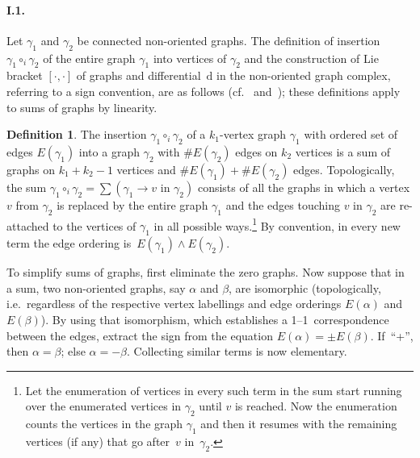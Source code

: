 \documentclass[a4paper]{jpconf}%
\theoremstyle{definition}
\newtheorem{define}{Definition}%
\theoremstyle{remark}
\newcommand{\Id}{{\mathrm d}}
\begin{document}
\paragraph{\textbf{\textup{I.1.}}}
Let $\gamma_1$ and $\gamma_2$ be connected non-oriented graphs. The definition of insertion $\gamma_1\circ_i\gamma_2$ %
of the entire graph $\gamma_1$ into vertices of $\gamma_2$ and the construction of Lie bracket $[\cdot,\cdot]$ of graphs and differential~$\Id$ in the non\/-\/oriented graph complex, referring to a sign convention, are as follows
(cf.~\cite{Ascona96} and~\cite{DolgushevRogersWillwacher,KhoroshkinWillwacherZivkovic,WillwacherGRT}); these definitions apply to sums of graphs by linearity.

\begin{define}\label{DefInsert}
The insertion $\gamma_1\circ_i\gamma_2$ of a $k_1$-vertex graph $\gamma_1$ with ordered set of edges $E(\gamma_1)$ into a graph $\gamma_2$ with $\# E(\gamma_2)$ edges on $k_2$ vertices is a %
sum of %
graphs on $k_1+k_2-1$ vertices and $\# E(\gamma_1)+\# E(\gamma_2)$ edges. 
Topologically, the sum $\gamma_1\circ_i\gamma_2 = \sum(\gamma_1\rightarrow v \text{ in }\gamma_2)$ %
 consists of all the graphs in which a vertex $v$ from $\gamma_2$ is replaced by the entire graph $\gamma_1$ and the edges tou\-ch\-ing $v$ in $\gamma_2$ are re-attached to the vertices of $\gamma_1$ in all possible ways.\footnote{Let the enumeration of vertices in every such term in the sum start running over the enumerated vertices in $\gamma_2$ until $v$ is reached.
Now the enumeration counts the vertices in the graph $\gamma_1$ and then it resumes with the remaining vertices (if any) that go after~$v$ %
in~$\gamma_2$.}
By convention, in every new term the edge ordering is~$E(\gamma_1)\wedge E(\gamma_2)$. \end{define}

To simplify sums of graphs, first eliminate the zero graphs.
Now suppose that in a sum, two non\/-\/oriented graphs, say $\alpha$ and $\beta$, are isomorphic (topologically, i.e.\ regardless of the respective vertex labellings and edge orderings $E(\alpha)$ and~$E(\beta)$).
By using that isomorphism, which establishes a 1--1~correspondence between the edges, extract the sign from the equation $E(\alpha) = \pm E(\beta)$.
If~``+'', then $\alpha = \beta$; else $\alpha = -\beta$.
Collecting similar terms is now elementary.
\end{document}
